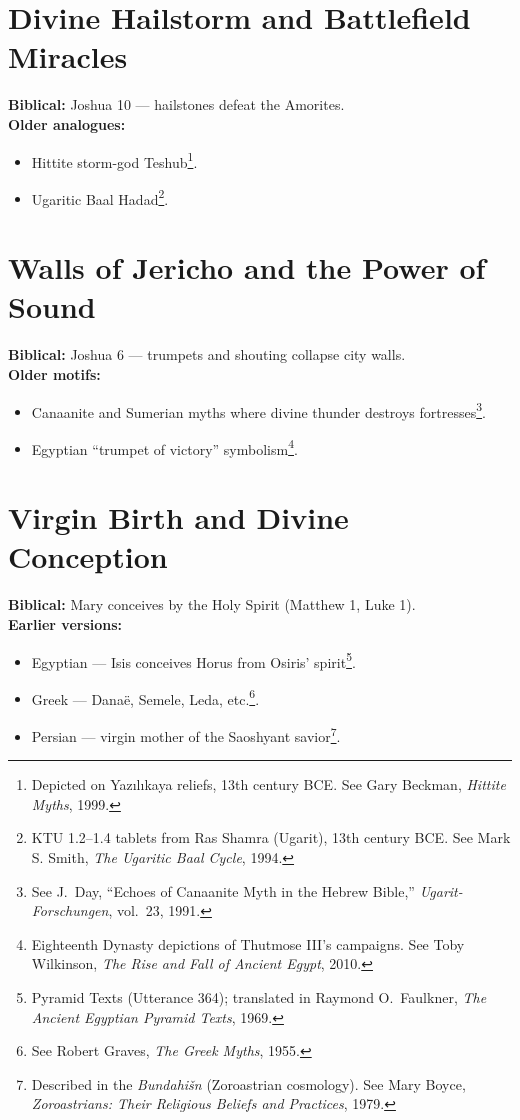 \documentclass[11pt,a4paper]{article}
\begin{document}
\section{Divine Hailstorm and Battlefield Miracles}
\textbf{Biblical:} Joshua 10 — hailstones defeat the Amorites.\\
\textbf{Older analogues:}
\begin{itemize}
  \item Hittite storm-god Teshub\footnote{Depicted on Yazılıkaya reliefs, 13th century BCE. See Gary Beckman, \emph{Hittite Myths}, 1999.}.
  \item Ugaritic Baal Hadad\footnote{KTU 1.2–1.4 tablets from Ras Shamra (Ugarit), 13th century BCE. See Mark S. Smith, \emph{The Ugaritic Baal Cycle}, 1994.}.
\end{itemize}

\section{Walls of Jericho and the Power of Sound}
\textbf{Biblical:} Joshua 6 — trumpets and shouting collapse city walls.\\
\textbf{Older motifs:}
\begin{itemize}
  \item Canaanite and Sumerian myths where divine thunder destroys fortresses\footnote{See J.\ Day, “Echoes of Canaanite Myth in the Hebrew Bible,” \emph{Ugarit-Forschungen}, vol.\ 23, 1991.}.
  \item Egyptian “trumpet of victory” symbolism\footnote{Eighteenth Dynasty depictions of Thutmose III’s campaigns. See Toby Wilkinson, \emph{The Rise and Fall of Ancient Egypt}, 2010.}.
\end{itemize}

\section{Virgin Birth and Divine Conception}
\textbf{Biblical:} Mary conceives by the Holy Spirit (Matthew 1, Luke 1).\\
\textbf{Earlier versions:}
\begin{itemize}
  \item Egyptian — Isis conceives Horus from Osiris’ spirit\footnote{Pyramid Texts (Utterance 364); translated in Raymond O.\ Faulkner, \emph{The Ancient Egyptian Pyramid Texts}, 1969.}.
  \item Greek — Danaë, Semele, Leda, etc.\footnote{See Robert Graves, \emph{The Greek Myths}, 1955.}.
  \item Persian — virgin mother of the Saoshyant savior\footnote{Described in the \emph{Bundahišn} (Zoroastrian cosmology). See Mary Boyce, \emph{Zoroastrians: Their Religious Beliefs and Practices}, 1979.}.
\end{itemize}
\end{document}
